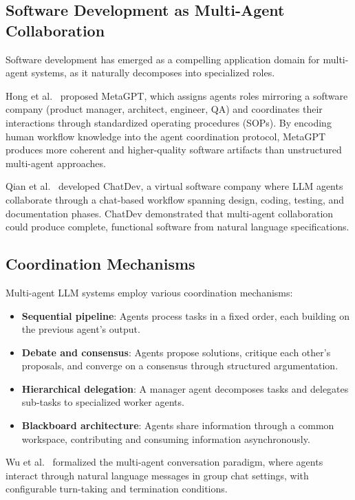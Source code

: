 \documentclass[11pt,a4paper]{article}
\begin{document}
\subsection{Software Development as Multi-Agent Collaboration}

Software development has emerged as a compelling application domain for multi-agent systems, as it naturally decomposes into specialized roles.

Hong et al.~\citep{hong2023metagpt} proposed MetaGPT, which assigns agents roles mirroring a software company (product manager, architect, engineer, QA) and coordinates their interactions through standardized operating procedures (SOPs). By encoding human workflow knowledge into the agent coordination protocol, MetaGPT produces more coherent and higher-quality software artifacts than unstructured multi-agent approaches.

Qian et al.~\citep{qian2023chatdev} developed ChatDev, a virtual software company where LLM agents collaborate through a chat-based workflow spanning design, coding, testing, and documentation phases. ChatDev demonstrated that multi-agent collaboration could produce complete, functional software from natural language specifications.

\subsection{Coordination Mechanisms}

Multi-agent LLM systems employ various coordination mechanisms:

\begin{itemize}
    \item \textbf{Sequential pipeline}: Agents process tasks in a fixed order, each building on the previous agent's output.
    \item \textbf{Debate and consensus}: Agents propose solutions, critique each other's proposals, and converge on a consensus through structured argumentation.
    \item \textbf{Hierarchical delegation}: A manager agent decomposes tasks and delegates sub-tasks to specialized worker agents.
    \item \textbf{Blackboard architecture}: Agents share information through a common workspace, contributing and consuming information asynchronously.
\end{itemize}

Wu et al.~\citep{wu2023autogen} formalized the multi-agent conversation paradigm, where agents interact through natural language messages in group chat settings, with configurable turn-taking and termination conditions.
\end{document}
